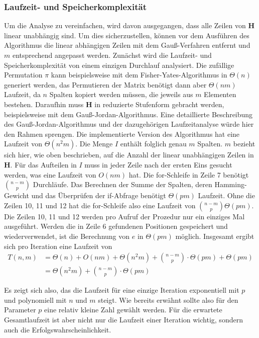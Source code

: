 \documentclass[a4paper,10pt,ngerman]{scrartcl}
\begin{document}
\subsubsection{Laufzeit- und Speicherkomplexität}
\label{sec:runtime}
Um die Analyse zu vereinfachen, wird davon ausgegangen, dass alle Zeilen von $\mathbf{H}$ linear unabhängig sind. 
Um dies sicherzustellen, können vor dem Ausführen des Algorithmus die linear abhängigen Zeilen mit dem Gauß-Verfahren entfernt und $m$ entsprechend angepasst werden. 
Zunächst wird die Laufzeit- und Speicherkomplexität von einem einzigen Durchlauf analysiert. 
Die zufällige Permutation $\pi$ kann beispielsweise mit dem Fisher-Yates-Algorithmus in $\Theta(n)$ generiert werden, das Permutieren der Matrix benötigt dann aber $\Theta(nm)$ Laufzeit, da $n$ Spalten kopiert werden müssen, die jeweils aus $m$ Elementen bestehen.
Daraufhin muss $\mathbf{H}$ in reduzierte Stufenform gebracht werden, beispielsweise mit dem Gauß-Jordan-Algorithmus. 
Eine detaillierte Beschreibung des Gauß-Jordan-Algorithmus und der dazugehörigen Laufzeitanalyse würde hier den Rahmen sprengen.
Die implementierte Version des Algorithmus hat eine Laufzeit von $\Theta(n^2m)$.
Die Menge $I$ enthält folglich genau $m$ Spalten.
$m$ bezieht sich hier, wie oben beschrieben, auf die Anzahl der linear unabhängigen Zeilen in $\mathbf{H}$.
Für das Aufteilen in $I$ muss in jeder Zeile nach der ersten Eins gesucht werden, was eine Laufzeit von $O(nm)$ hat.
Die for-Schleife in Zeile 7 benötigt $\binom{n-m}{p}$ Durchläufe.
Das Berechnen der Summe der Spalten, deren Hamming-Gewicht und das Überprüfen der if-Abfrage benötigt $\Theta(pm)$ Laufzeit. 
Ohne die Zeilen 10, 11 und 12 hat die for-Schleife also eine Laufzeit von $\binom{n-m}{p}\Theta(pm)$.
Die Zeilen 10, 11 und 12 werden pro Aufruf der Prozedur nur ein einziges Mal ausgeführt. Werden die in Zeile 6 gefundenen Positionen gespeichert und wiederverwendet, ist die Berechnung von $e$ in $\Theta(pm)$ möglich. 
Insgesamt ergibt sich pro Iteration eine Laufzeit von 
\begin{align*}
    T(n, m) &= \Theta(n) + O(nm) + \Theta(n^2m) + \binom{n-m}{p} \cdot \Theta(pm) + \Theta(pm)\\
            &= \Theta(n^2m) + \binom{n-m}{p}\cdot \Theta(pm)
\end{align*}

Es zeigt sich also, das die Laufzeit für eine einzige Iteration exponentiell mit $p$ und polynomiell mit $n$ und $m$ steigt. Wie bereits erwähnt sollte also für den Parameter $p$ eine relativ kleine Zahl gewählt werden.
Für die erwartete Gesamtlaufzeit ist aber nicht nur die Laufzeit einer Iteration wichtig, sondern auch die Erfolgswahrscheinlichkeit.
\end{document}
